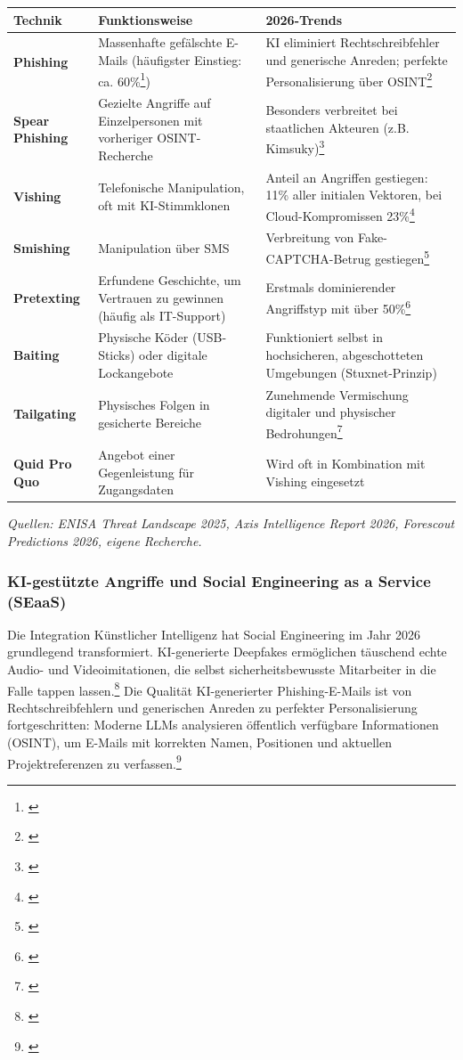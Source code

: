 \documentclass[10pt,a4paper]{article}
\begin{document}
	\begin{center}
		\begin{tabular}{@{}p{}p{}p{}@{}}
			\toprule
			\textbf{Technik} & \textbf{Funktionsweise} & \textbf{2026-Trends} \\
			\midrule
			\textbf{Phishing} & Massenhafte gefälschte E-Mails (häufigster Einstieg: ca. 60\%\footnote{\cite{ENISAThreat}}) & KI eliminiert Rechtschreibfehler und generische Anreden; perfekte Personalisierung über OSINT\footnote{\cite{DEV2026SE}} \\
			\textbf{Spear Phishing} & Gezielte Angriffe auf Einzelpersonen mit vorheriger OSINT-Recherche & Besonders verbreitet bei staatlichen Akteuren (z.B. Kimsuky)\footnote{\cite{BSI:Lagebericht2025}} \\
			\textbf{Vishing} & Telefonische Manipulation, oft mit KI-Stimmklonen & Anteil an Angriffen gestiegen: 11\% aller initialen Vektoren, bei Cloud-Kompromissen 23\%\footnote{\cite{AxisStats}} \\
			\textbf{Smishing} & Manipulation über SMS & Verbreitung von Fake-CAPTCHA-Betrug gestiegen\footnote{\cite{ENISAThreat}} \\
			\textbf{Pretexting} & Erfundene Geschichte, um Vertrauen zu gewinnen (häufig als IT-Support) & Erstmals dominierender Angriffstyp mit über 50\%\footnote{\cite{AxisStats}} \\
			\textbf{Baiting} & Physische Köder (USB-Sticks) oder digitale Lockangebote & Funktioniert selbst in hochsicheren, abgeschotteten Umgebungen (Stuxnet-Prinzip) \\
			\textbf{Tailgating} & Physisches Folgen in gesicherte Bereiche & Zunehmende Vermischung digitaler und physischer Bedrohungen\footnote{\cite{Forescout2026}} \\
			\textbf{Quid Pro Quo} & Angebot einer Gegenleistung für Zugangsdaten & Wird oft in Kombination mit Vishing eingesetzt \\
			\bottomrule
		\end{tabular}
	\end{center}
	\emph{Quellen: ENISA Threat Landscape 2025, Axis Intelligence Report 2026, Forescout Predictions 2026, eigene Recherche.}
	
	\subsubsection{KI-gestützte Angriffe und Social Engineering as a Service (SEaaS)}
	Die Integration Künstlicher Intelligenz hat Social Engineering im Jahr 2026 grundlegend transformiert. KI-generierte Deepfakes ermöglichen täuschend echte Audio- und Videoimitationen, die selbst sicherheitsbewusste Mitarbeiter in die Falle tappen lassen.\footnote{\cite{Psono2025}} Die Qualität KI-generierter Phishing-E-Mails ist von Rechtschreibfehlern und generischen Anreden zu perfekter Personalisierung fortgeschritten: Moderne LLMs analysieren öffentlich verfügbare Informationen (OSINT), um E-Mails mit korrekten Namen, Positionen und aktuellen Projektreferenzen zu verfassen.\footnote{\cite{DEV2026SE}} 
	
\end{document}
